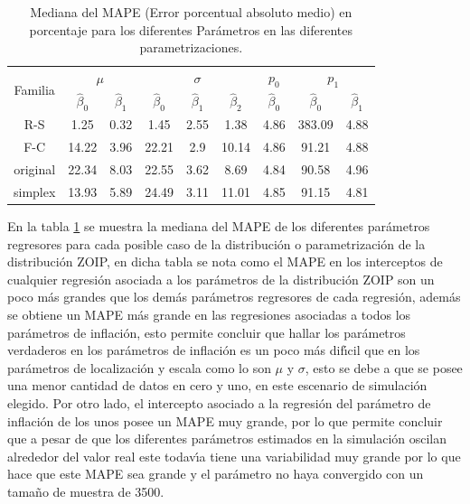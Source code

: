 \begin{table}[!hbt]
{\scriptsize
\begin{center}
\begin{tabular}{|c|cc|ccc|c|cc|}\hline
\multirow{2}{*}{Familia} & \multicolumn{2}{|c|}{$\mu$} & \multicolumn{3}{|c|}{$\sigma$} & $p_0$ & \multicolumn{2}{|c|}{$p_1$} \\ \cline{2-9}
& $\hat{\beta}_0$& $\hat{\beta}_1$& $\hat{\beta}_0$& $\hat{\beta}_1$& $\hat{\beta}_2$& $\hat{\beta}_0$ & $\hat{\beta}_0$ & $\hat{\beta}_1$ \\ \hline \hline
R-S & 1.25 & 0.32 & 1.45 & 2.55 & 1.38 & 4.86 & 383.09 & 4.88 \\ 
F-C & 14.22 & 3.96 & 22.21 & 2.9 & 10.14 & 4.86 & 91.21 & 4.88 \\
original & 22.34 & 8.03 & 22.55 & 3.62 & 8.69 & 4.84 & 90.58 & 4.96 \\
simplex & 13.93 & 5.89 & 24.49 & 3.11 & 11.01 & 4.85 & 91.15 & 4.81 \\ \hline
\end{tabular}
\caption{Mediana del MAPE (Error porcentual absoluto medio) en porcentaje para los diferentes Par\'{a}metros en las diferentes parametrizaciones.}
\label{MAPE}
\end{center}
}
\end{table}

En la tabla \ref{MAPE} se muestra la mediana del MAPE de los diferentes par\'{a}metros regresores para cada posible caso de la distribuci\'{o}n o parametrizaci\'{o}n de la distribuci\'{o}n ZOIP, en dicha tabla se nota como el MAPE en los interceptos de cualquier regresi\'{o}n asociada a los par\'{a}metros de la distribuci\'{o}n ZOIP son un poco m\'{a}s grandes que los dem\'{a}s par\'{a}metros regresores de cada regresi\'{o}n, adem\'{a}s se obtiene un MAPE m\'{a}s grande en las regresiones asociadas a todos los par\'{a}metros de inflaci\'{o}n, esto permite concluir que hallar los par\'{a}metros verdaderos en los par\'{a}metros de inflaci\'{o}n es un poco m\'{a}s dif\'{\i}cil que en los par\'{a}metros de localizaci\'{o}n y escala como lo son $\mu$ y $\sigma$, esto se debe a que se posee una menor cantidad de datos en cero y uno, en este escenario de simulaci\'{o}n elegido. Por otro lado, el intercepto asociado a la regresi\'{o}n del par\'{a}metro de inflaci\'{o}n de los unos posee un MAPE muy grande, por lo que permite concluir que a pesar de que los diferentes par\'{a}metros estimados en la simulaci\'{o}n oscilan alrededor del valor real este todav\'{\i}a tiene una variabilidad muy grande por lo que hace que este MAPE sea grande y el par\'{a}metro no haya convergido con un tama\~{n}o de muestra de 3500.\\


